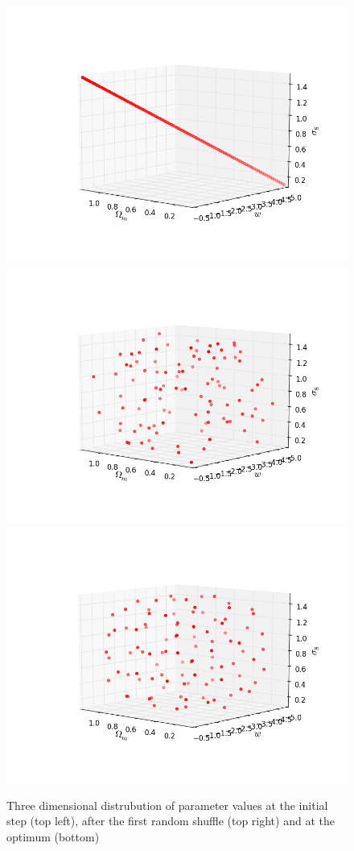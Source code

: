 \documentclass[11pt]{article}
\begin{document}
\begin{figure}
\begin{center}
\includegraphics[scale=0.4]{Figures/3dpoints_diagonal.png}
\includegraphics[scale=0.4]{Figures/3dpoints_first_shuffle.png}
\includegraphics[scale=0.4]{Figures/3dpoints.png}
\end{center}
\caption{Three dimensional distrubution of parameter values at the initial step (top left), after the first random shuffle (top right) and at the optimum (bottom)}
\label{3Ddistr}
\end{figure}
\end{document}
